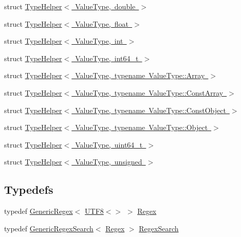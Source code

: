 \begin{DoxyCompactItemize}
struct \mbox{\hyperlink{structrapidjson_1_1internal_1_1_type_helper_3_01_value_type_00_01double_01_4}{Type\+Helper$<$ Value\+Type, double $>$}}
\item 
struct \mbox{\hyperlink{structrapidjson_1_1internal_1_1_type_helper_3_01_value_type_00_01float_01_4}{Type\+Helper$<$ Value\+Type, float $>$}}
\item 
struct \mbox{\hyperlink{structrapidjson_1_1internal_1_1_type_helper_3_01_value_type_00_01int_01_4}{Type\+Helper$<$ Value\+Type, int $>$}}
\item 
struct \mbox{\hyperlink{structrapidjson_1_1internal_1_1_type_helper_3_01_value_type_00_01int64__t_01_4}{Type\+Helper$<$ Value\+Type, int64\+\_\+t $>$}}
\item 
struct \mbox{\hyperlink{structrapidjson_1_1internal_1_1_type_helper_3_01_value_type_00_01typename_01_value_type_1_1_array_01_4}{Type\+Helper$<$ Value\+Type, typename Value\+Type\+::\+Array $>$}}
\item 
struct \mbox{\hyperlink{structrapidjson_1_1internal_1_1_type_helper_3_01_value_type_00_01typename_01_value_type_1_1_const_array_01_4}{Type\+Helper$<$ Value\+Type, typename Value\+Type\+::\+Const\+Array $>$}}
\item 
struct \mbox{\hyperlink{structrapidjson_1_1internal_1_1_type_helper_3_01_value_type_00_01typename_01_value_type_1_1_const_object_01_4}{Type\+Helper$<$ Value\+Type, typename Value\+Type\+::\+Const\+Object $>$}}
\item 
struct \mbox{\hyperlink{structrapidjson_1_1internal_1_1_type_helper_3_01_value_type_00_01typename_01_value_type_1_1_object_01_4}{Type\+Helper$<$ Value\+Type, typename Value\+Type\+::\+Object $>$}}
\item 
struct \mbox{\hyperlink{structrapidjson_1_1internal_1_1_type_helper_3_01_value_type_00_01uint64__t_01_4}{Type\+Helper$<$ Value\+Type, uint64\+\_\+t $>$}}
\item 
struct \mbox{\hyperlink{structrapidjson_1_1internal_1_1_type_helper_3_01_value_type_00_01unsigned_01_4}{Type\+Helper$<$ Value\+Type, unsigned $>$}}
\end{DoxyCompactItemize}
\subsection*{Typedefs}
\begin{DoxyCompactItemize}
\item 
typedef \mbox{\hyperlink{classrapidjson_1_1internal_1_1_generic_regex}{Generic\+Regex}}$<$ \mbox{\hyperlink{structrapidjson_1_1_u_t_f8}{U\+T\+F8}}$<$$>$ $>$ \mbox{\hyperlink{namespacerapidjson_1_1internal_a6e31418488a57106fa341bc0e6fe7960}{Regex}}
\item 
typedef \mbox{\hyperlink{classrapidjson_1_1internal_1_1_generic_regex_search}{Generic\+Regex\+Search}}$<$ \mbox{\hyperlink{namespacerapidjson_1_1internal_a6e31418488a57106fa341bc0e6fe7960}{Regex}} $>$ \mbox{\hyperlink{namespacerapidjson_1_1internal_a8790aa6e3fc1729f369b06cf84e76fae}{Regex\+Search}}
\end{DoxyCompactItemize}
